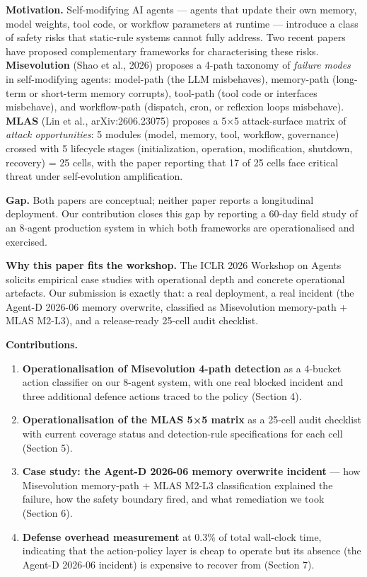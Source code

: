 \textbf{Motivation.} Self-modifying AI agents --- agents that update
their own memory, model weights, tool code, or workflow parameters at
runtime --- introduce a class of safety risks that static-rule systems
cannot fully address. Two recent papers have proposed complementary
frameworks for characterising these risks. \textbf{Misevolution} (Shao
et al., 2026) proposes a 4-path taxonomy of \emph{failure modes} in
self-modifying agents: model-path (the LLM misbehaves), memory-path
(long-term or short-term memory corrupts), tool-path (tool code or
interfaces misbehave), and workflow-path (dispatch, cron, or reflexion
loops misbehave). \textbf{MLAS} (Lin et al., arXiv:2606.23075) proposes
a 5×5 attack-surface matrix of \emph{attack opportunities}: 5 modules
(model, memory, tool, workflow, governance) crossed with 5 lifecycle
stages (initialization, operation, modification, shutdown, recovery) =
25 cells, with the paper reporting that 17 of 25 cells face critical
threat under self-evolution amplification.

\textbf{Gap.} Both papers are conceptual; neither paper reports a
longitudinal deployment. Our contribution closes this gap by reporting a
60-day field study of an 8-agent production system in which both
frameworks are operationalised and exercised.

\textbf{Why this paper fits the workshop.} The ICLR 2026 Workshop on
Agents solicits empirical case studies with operational depth and
concrete operational artefacts. Our submission is exactly that: a real
deployment, a real incident (the Agent-D 2026-06 memory overwrite,
classified as Misevolution memory-path + MLAS M2-L3), and a
release-ready 25-cell audit checklist.

\textbf{Contributions.}

\begin{enumerate}
\def\labelenumi{\arabic{enumi}.}
\tightlist
\item
  \textbf{Operationalisation of Misevolution 4-path detection} as a
  4-bucket action classifier on our 8-agent system, with one real
  blocked incident and three additional defence actions traced to the
  policy (Section 4).
\item
  \textbf{Operationalisation of the MLAS 5×5 matrix} as a 25-cell audit
  checklist with current coverage status and detection-rule
  specifications for each cell (Section 5).
\item
  \textbf{Case study: the Agent-D 2026-06 memory overwrite incident} ---
  how Misevolution memory-path + MLAS M2-L3 classification explained the
  failure, how the safety boundary fired, and what remediation we took
  (Section 6).
\item
  \textbf{Defense overhead measurement} at 0.3\% of total wall-clock
  time, indicating that the action-policy layer is cheap to operate but
  its absence (the Agent-D 2026-06 incident) is expensive to recover
  from (Section 7).
\end{enumerate}

